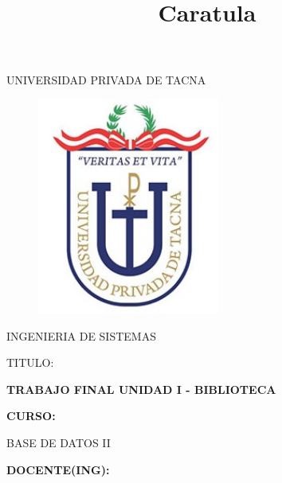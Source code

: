 \documentclass[12pt]{article}
\begin{document}
\title{Caratula}

\begin{titlepage}
\begin{center}
\large{UNIVERSIDAD PRIVADA DE TACNA}\\
\vspace*{0.1in}
\begin{figure}[htb]
\begin{center}
\includegraphics[width=6cm]{./media/logo_upt}
\end{center}
\end{figure}
\vspace*{0.15in}
INGENIERIA DE SISTEMAS  \\



\vspace*{0.5in}
\begin{large}
TITULO:\\
\end{large}

\vspace*{0.1in}
\begin{Large}
\textbf{TRABAJO FINAL UNIDAD I - BIBLIOTECA} \\
\end{Large}

\vspace*{0.3in}
\begin{Large}
\textbf{CURSO:} \\
\end{Large}

\vspace*{0.1in}
\begin{large}
BASE DE DATOS II\\
\end{large}

\vspace*{0.3in}
\begin{Large}
\textbf{DOCENTE(ING):} \\
\end{Large}


\end{center}
\end{titlepage}
\end{document}
